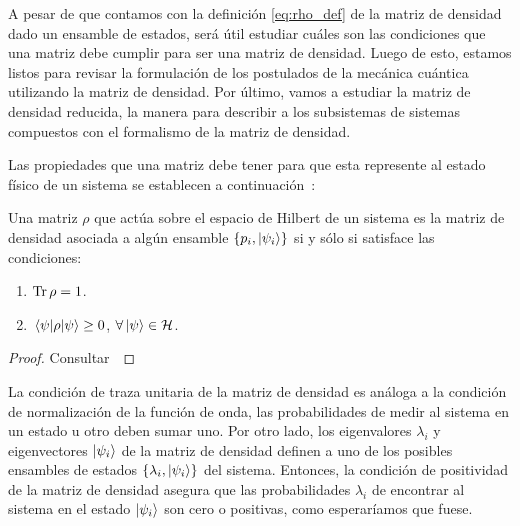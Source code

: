 A pesar de que contamos con la definición \eqref{eq:rho_def} de 
la matriz de densidad dado un ensamble de estados, será útil 
estudiar cuáles son las condiciones que una matriz debe cumplir 
para ser una matriz de densidad. Luego de esto, estamos listos 
para revisar la formulación de los postulados de la mecánica cuántica
utilizando la matriz de densidad. Por último, vamos a estudiar la
matriz de densidad reducida, la manera para describir a los
subsistemas de sistemas compuestos con el formalismo 
de la matriz de densidad.

Las propiedades que una matriz debe tener para que esta represente al 
estado físico de un sistema se establecen a 
continuación~\cite{nielsen_chuang_2011}:
\begin{thm}\label{teo:density-matrix}
Una matriz $\rho$  que actúa sobre el espacio de Hilbert de un sistema 
es la matriz de densidad asociada a algún ensamble 
$\{p_i, \ket{\psi _i} \}$ si y sólo si satisface las condiciones:
\begin{enumerate}
\item $\Tr \rho = 1$.
\item $\matrixel{\psi}{\rho}{\psi} \geq 0$, $\forall\ket{\psi} \in \mathcal{H}$.
\end{enumerate}	
\end{thm} 
\begin{proof} Consultar~\cite[p.~101]{nielsen_chuang_2011} \end{proof}

La condición de traza unitaria de la matriz de densidad es análoga
a la condición de normalización de la función de onda, las probabilidades
de medir al sistema en un estado u otro deben sumar uno. 
Por otro lado, los eigenvalores $\lambda_i$ y eigenvectores $\ket{\psi_i}$ de la 
matriz de densidad definen a uno de los posibles ensambles de estados
$\{\lambda_i, \ket{\psi_i} \}$ del sistema. Entonces,
la condición de positividad de la matriz de densidad asegura que las
probabilidades $\lambda_i$ de encontrar al sistema en el estado $\ket{\psi_i}$
son cero o positivas, como esperaríamos que fuese. 

